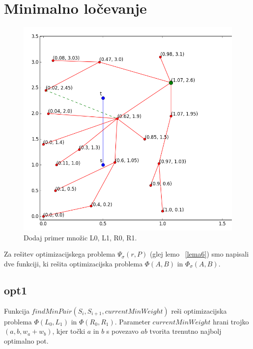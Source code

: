 \documentclass[a4paper, 12pt]{book}
\begin{document}




\section{Minimalno ločevanje}

\begin{figure}
\centerline{\includegraphics[scale=0.7]{pics/primer1.png}}
\caption{Dodaj primer množic L0, L1, R0, R1. }
\label{primer-sep}
\end{figure}


Za rešitev optimizacijskega problema $\Psi_\sigma(r,P)$ (glej lemo ~\ref{lema6}) smo napisali dve funkciji, ki rešita optimizacijska problema $\Phi(A,B)$ in $\Phi_\sigma(A,B)$.

\subsection{opt1}
Funkcija $findMinPair(S_i, S_{i+1}, currentMinWeight)$ reši optimizacijska problema $\Phi(L_0, L_1)$ in $\Phi(R_0, R_1)$. Parameter $currentMinWeight$ hrani trojko $(a, b, w_a + w_b)$, kjer točki $a$ in $b$ s povezavo $ab$ tvorita trenutno najbolj optimalno pot.
\end{document}
